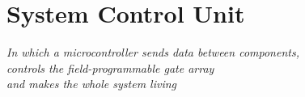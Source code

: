 \chapter{System Control Unit}\label{ch:avr}

\begin{flushright}{\slshape
    In which a microcontroller sends data between components,\\
    controls the field-programmable gate array\\
    and makes the whole system living
}
\end{flushright}







